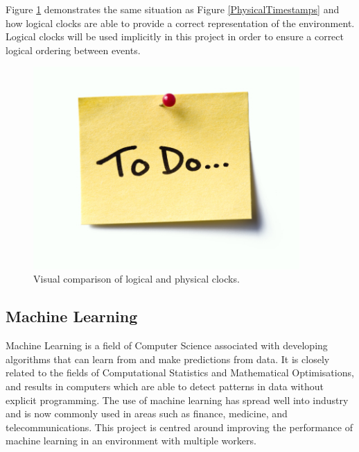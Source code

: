\documentclass[12pt]{article}
\begin{document}
Figure \ref{LogicalTimestamps} demonstrates the same situation as Figure \ref{PhysicalTimestamps} and how logical clocks are able to provide a correct representation of the environment. Logical clocks will be used implicitly in this project in order to ensure a correct logical ordering between events.

\begin{figure}[H]
  \centering
  \includegraphics[width=4in]{todo}
  \caption[]{Visual comparison of logical and physical clocks.}
  \label{LogicalTimestamps}
\end{figure}

\subsection{Machine Learning}
Machine Learning is a field of Computer Science associated with developing algorithms that can learn from and make predictions from data\cite{machineLearningDef}. It is closely related to the fields of Computational Statistics and Mathematical Optimisations, and results in computers which are able to detect patterns in data without explicit programming. The use of machine learning has spread well into industry and is now commonly used in areas such as finance, medicine, and telecommunications. This project is centred around improving the performance of machine learning in an environment with multiple workers.
\end{document}
